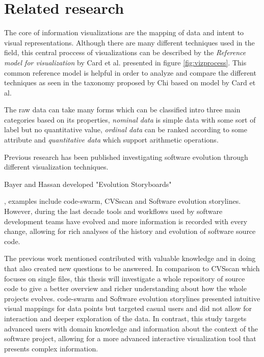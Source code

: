

\section{Related research}
The core of information visualizations are the mapping of data and intent to visual representations. Although there are many different techniques used in the field, this central proccess of visualizations can be described by the \textit{Reference model for visualization} by Card et al. presented in figure \ref{fig:vizprocess}. \cite{card_readings_1999} 
This common reference model is helpful in order to analyze and compare the different techniques as seen in the taxonomy proposed by Chi based on model by Card et al. \cite{chi_taxonomy_2000}



The raw data can take many forms which can be classified intro three main categories based on its properties, \textit{nominal data} is simple data with some sort of label but no quantitative value, \textit{ordinal data} can be ranked according to some attribute and \textit{quantitative data} which support arithmetic operations. \cite{card_structure_1997}

Previous research has been published investigating software evolution through different visualization techniques. 


Bayer and Hassan developed "Evolution Storyboards"


, examples include code-swarm, CVSscan and Software evolution storylines. However, during the last decade tools and workflows used by software development teams have evolved and more information is recorded with every change, allowing for rich analyses of the history and evolution of software source code.

The previous work mentioned contributed with valuable knowledge and in doing that also created new questions to be answered. In comparison to CVSscan which focuses on single files, this thesis will investigate a whole repository of source code to give a better overview and richer understanding about how the whole projects evolves. code-swarm and Software evolution storylines presented intuitive visual mappings for data points but targeted casual users and did not allow for interaction and deeper exploration of the data. In contrast, this study targets advanced users with domain knowledge and information about the context of the software project, allowing for a more advanced interactive visualization tool that presents complex information.
